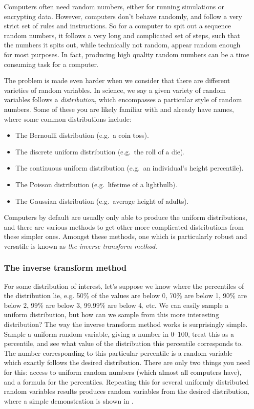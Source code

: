 \documentclass[11pt,a4paper,twoside,english]{extarticle}
\begin{document}
Computers often need random numbers, either for running simulations or encrypting data. However, computers don't behave randomly, and follow a very strict set of rules and instructions. So for a computer to spit out a sequence random numbers, it follows a very long and complicated set of steps, such that the numbers it spits out, while technically not random, appear random enough for most purposes. In fact, producing high quality random numbers can be a time consuming task for a computer.

The problem is made even harder when we consider that there are different varieties of random variables. In science, we say a given variety of random variables follows a \emph{distribution}, which encompasses a particular style of random numbers. Some of these you are likely familiar with and already have names, where some common distributions include:

\begin{itemize}
\item The Bernoulli distribution (e.g.\ a coin toss).
\item The discrete uniform distribution (e.g.\ the roll of a die).
\item The continuous uniform distribution (e.g.\ an individual's height percentile).
\item The Poisson distribution (e.g.\ lifetime of a lightbulb). 
\item The Gaussian distribution (e.g.\ average height of adults).
\end{itemize}

Computers by default are usually only able to produce the uniform distributions, and there are various methods to get other more complicated distributions from these simpler ones. Amongst these methods, one which is particularly robust and versatile is known as \emph{the inverse transform method}.

\subsubsection{The inverse transform method}

For some distribution of interest, let's suppose we know where the percentiles of the distribution lie, e.g. 50\% of the values are below 0, 70\% are below 1, 90\% are below 2, 99\% are below 3, 99.99\% are below  4, etc. We can easily sample a uniform distribution, but how can we sample from this more interesting distribution? The way the inverse transform method works is surprisingly simple. Sample a uniform random variable, giving a number in 0--100, treat this as a percentile, and see what value of the distribution this percentile corresponds to. The number corresponding to this particular percentile is a random variable which exactly follows the desired distribution. There are only two things you need for this: access to uniform random numbers (which almost all computers have), and a formula for the percentiles. Repeating this for several uniformly distributed random variables results produces random variables from the desired distribution, where a simple demonstration is shown in .
\end{document}
